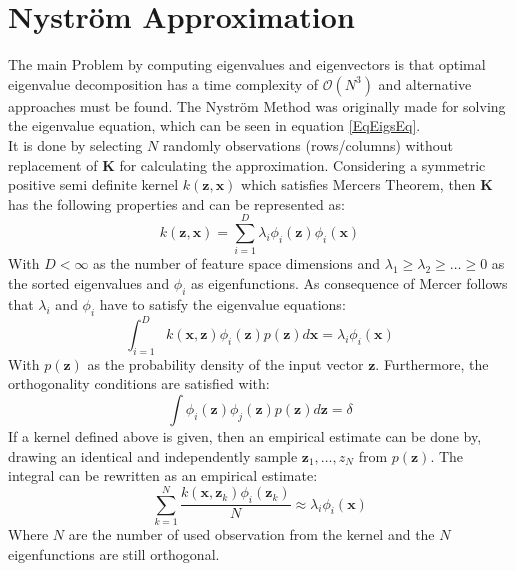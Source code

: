 \section{Nyström Approximation}\label{InSecNysMeth}
The main Problem by computing eigenvalues and eigenvectors is that optimal eigenvalue decomposition has a time complexity of $\mathcal{O}(N^3)$ and alternative approaches must be found.
The Nyström Method was originally made for solving the eigenvalue equation, which can be seen in equation \eqref{EqEigsEq}.\cite{Zhang.2008}\\
It is done by selecting $N$ randomly observations (rows/columns) without replacement of $\mathbf{K}$ for calculating the approximation.\cite{Williams.2000}
Considering a symmetric positive semi definite kernel $k(\mathbf{z},\mathbf{x})$ which satisfies Mercers Theorem, then $\mathbf{K}$ has the following properties and can be represented as:\cite{Williams.2000}
\begin{equation}\label{EqKernelRep}
	k(\mathbf{z},\mathbf{x}) = \sum_{i=1}^{D}\lambda_i\phi_i(\mathbf{z})\phi_i(\mathbf{x}) 
\end{equation}
With $D < \infty$ as the number of feature space dimensions and $\lambda_1 \ge \lambda_2\ge\dots\ge0$ as the sorted eigenvalues and $\phi_i$ as eigenfunctions.
As consequence of Mercer follows that  $\lambda_i$ and $\phi_i$ have to satisfy the eigenvalue equations:
 \begin{equation}\label{EqEigsEq}
	\int_{i=1}^{D} k(\mathbf{x},\mathbf{z})\phi_i(\mathbf{z})p(\mathbf{z})d\mathbf{x} = \lambda_i\phi_i(\mathbf{x})
\end{equation}
With $p(\mathbf{z})$ as the probability density of the input vector $\mathbf{z}$.
Furthermore, the orthogonality conditions are satisfied with:\cite[p. 59]{Scholkopf.2001}
\begin{equation}\label{EqEigsOrt}
	\int \phi_i(\mathbf{z})\phi_j(\mathbf{z})p(\mathbf{z})d\mathbf{z} = \delta
\end{equation}
If a kernel defined above is given, then an empirical estimate can be done by, drawing an identical and independently sample ${\mathbf{z}_1,\dots,z_N}$ from $p(\mathbf{z})$.
The integral can be rewritten as an empirical estimate:\cite{Williams.2000}
\begin{equation}\label{EqEigsEmp}
	\sum_{k=1}^{N}\frac{k(\mathbf{x},\mathbf{z}_k)\phi_i(\mathbf{z}_k)}{N} \approx \lambda_i\phi_i(\mathbf{x})
\end{equation}
Where $N$ are the number of used observation from the kernel and the $N$ eigenfunctions are still orthogonal.
